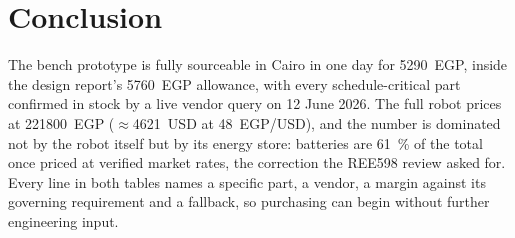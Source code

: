 \documentclass[11pt,a4paper]{article}
\begin{document}
\section{Conclusion}

The bench prototype is fully sourceable in Cairo in one day for
\num{5290}~EGP, inside the design report's \num{5760}~EGP allowance, with
every schedule-critical part confirmed in stock by a live vendor query on
12 June 2026. The full robot prices at \num{221800}~EGP
($\approx$\num{4621}~USD at \num{48}~EGP/USD), and the number is dominated
not by the robot itself but by its energy store: batteries are
\SI{61}{\percent} of the total once priced at verified market rates, the
correction the REE598 review asked for. Every line in both tables names a
specific part, a vendor, a margin against its governing requirement and a
fallback, so purchasing can begin without further engineering input.



\end{document}
